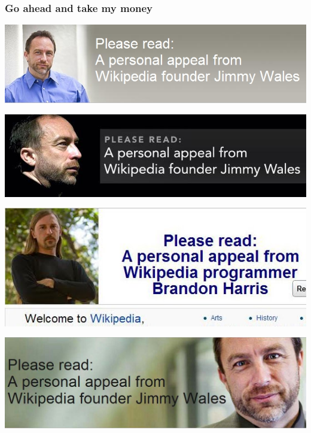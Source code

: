 \documentclass{beamer}
\begin{document}
\begin{frame}
  \frametitle{Go ahead and take my money}
  \begin{center}
    \includegraphics[width = \textwidth, height = 0.2\textheight, keepaspectratio = true]{figure/appeal_1}

    \includegraphics[width = \textwidth, height = 0.2\textheight, keepaspectratio = true]{figure/appeal_2}

    \includegraphics[width = \textwidth, height = 0.2\textheight, keepaspectratio = true]{figure/appeal_3}

    \includegraphics[width = \textwidth, height = 0.2\textheight, keepaspectratio = true]{figure/appeal_4}
  \end{center}
\end{frame}
\end{document}
